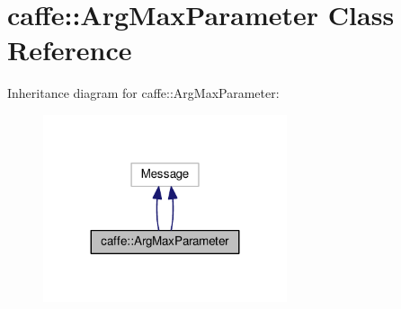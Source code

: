 \hypertarget{classcaffe_1_1_arg_max_parameter}{}\section{caffe\+:\+:Arg\+Max\+Parameter Class Reference}
\label{classcaffe_1_1_arg_max_parameter}


Inheritance diagram for caffe\+:\+:Arg\+Max\+Parameter\+:
\nopagebreak
\begin{figure}[H]
\begin{center}
\leavevmode
\includegraphics[width=203pt]{classcaffe_1_1_arg_max_parameter__inherit__graph}
\end{center}
\end{figure}
